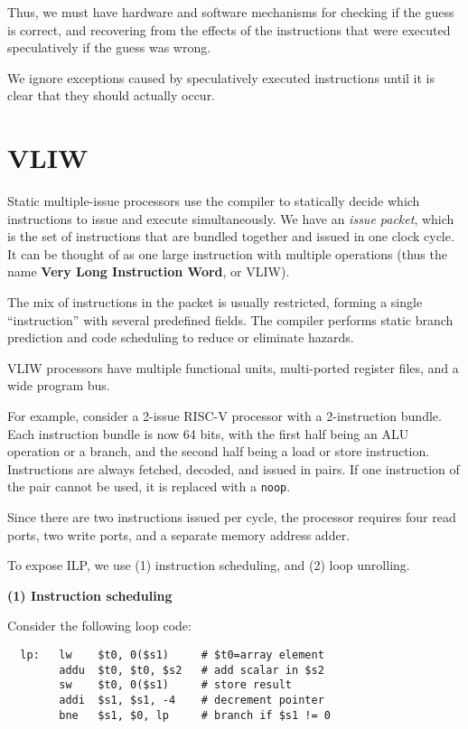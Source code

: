 Thus, we must have hardware and software mechanisms for checking if the guess is correct, and recovering from the effects of the instructions that were executed speculatively if the guess was wrong.

We ignore exceptions caused by speculatively executed instructions until it is clear that they should actually occur.

\section{VLIW}
Static multiple-issue processors use the compiler to statically decide which instructions to issue and execute simultaneously. We have an \textit{issue packet}, which is the set of instructions that are bundled together and issued in one clock cycle. It can be thought of as one large instruction with multiple operations (thus the name \textbf{Very Long Instruction Word}, or VLIW). 

The mix of instructions in the packet is usually restricted, forming a single ``instruction'' with several predefined fields. The compiler performs static branch prediction and code scheduling to reduce or eliminate hazards.

VLIW processors have multiple functional units, multi-ported register files, and a wide program bus.

For example, consider a 2-issue RISC-V processor with a 2-instruction bundle. Each instruction bundle is now 64 bits, with the first half being an ALU operation or a branch, and the second half being a load or store instruction. Instructions are always fetched, decoded, and issued in pairs. If one instruction of the pair cannot be used, it is replaced with a \texttt{noop}. 

Since there are two instructions issued per cycle, the processor requires four read ports, two write ports, and a separate memory address adder.

To expose ILP, we use (1) instruction scheduling, and (2) loop unrolling.

\textbf{(1) Instruction scheduling }

Consider the following loop code: 
\begin{verbatim}
  lp:   lw    $t0, 0($s1)     # $t0=array element
        addu  $t0, $t0, $s2   # add scalar in $s2
        sw    $t0, 0($s1)     # store result
        addi  $s1, $s1, -4    # decrement pointer
        bne   $s1, $0, lp     # branch if $s1 != 0
\end{verbatim}

